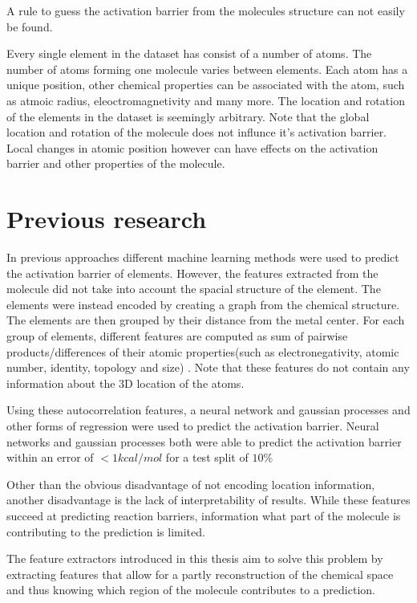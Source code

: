 A rule to guess the activation barrier from the molecules structure can not easily be found.

Every single element in the dataset has consist of a number of atoms.
The number of atoms forming one molecule varies between elements.
Each atom has a unique position, other chemical properties can be associated with the atom, such as atmoic radius, eleoctromagnetivity and many more.
The location and rotation of the elements in the dataset is seemingly arbitrary.
Note that the global location and rotation of the molecule does not influnce it's activation barrier.
Local changes in atomic position however can have effects on the activation barrier and other properties of the molecule.
  

\section{Previous research}

In previous approaches different machine learning methods were used to predict the activation barrier of elements.
However, the features extracted from the molecule did not take into account the spacial structure of the element.
The elements were instead encoded by creating a graph from the chemical structure.
The elements are then grouped by their distance from the metal center.
For each group of elements, different features are computed as sum of pairwise products/differences of their atomic properties(such as electronegativity, atomic number, identity, topology and size) \cite{friederich_dos}.
Note that these features do not contain any information about the 3D location of the atoms.

Using these autocorrelation features, a neural network and gaussian processes and other forms of regression were used to predict the activation barrier.
Neural networks and gaussian processes both were able to predict the activation barrier within an error of $<1 kcal/mol$ for a test split of $10\%$

Other than the obvious disadvantage of not encoding location information, another disadvantage is the lack of interpretability of results.
While these features succeed at predicting reaction barriers, information what part of the molecule is contributing to the prediction is limited.

The feature extractors introduced in this thesis aim to solve this problem by extracting features that allow for a
partly reconstruction of the chemical space and thus knowing which region of the molecule contributes to a prediction.


